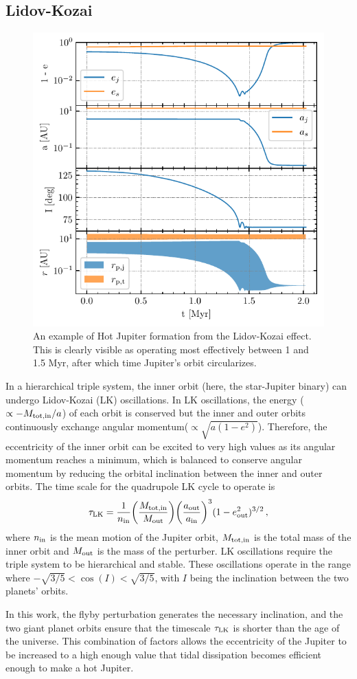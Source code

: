 \documentclass[twocolumn]{aastex63}
\begin{document}
\subsection{Lidov-Kozai}
\begin{figure}
    \includegraphics[width=.5\textwidth]{figs/example2.pdf}
    \caption{An example of Hot Jupiter formation from the Lidov-Kozai effect. This is clearly visible as operating most effectively between 1 and 1.5 Myr, after which time Jupiter's orbit circularizes.}
    \label{fig:LK}
\end{figure}
In a hierarchical triple system, the inner orbit (here, the star-Jupiter binary) can undergo Lidov-Kozai (LK) oscillations. In LK oscillations, the energy ($\propto -M_{\rm tot,in}/a$) of each orbit is conserved but the inner and outer orbits continuously exchange angular momentum($\propto \sqrt{a(1-e^2)}$). Therefore, the eccentricity of the inner orbit can be excited to very high values as its angular momentum reaches a minimum, which is balanced to conserve angular momentum by reducing the orbital inclination between the inner and outer orbits. The time scale for the quadrupole LK cycle to operate is
\begin{equation}\label{eq:time-LK}
\tau_{\rm LK}=\frac{1}{n_{\rm in}}\bigg(\frac{M_{\rm tot,in}}{M_{\rm out}} \bigg)\bigg( \frac{a_{\rm out}}{a_{\rm in}}\bigg)^3(1-e_{\rm out}^2)^{3/2}\,,
\end{equation}
where $n_{\rm in}$ is the mean motion of the Jupiter orbit, $M_{\rm tot, in}$ is the total mass of the inner orbit and $M_{\rm out}$ is the mass of the perturber. LK oscillations require the triple system to be hierarchical and stable. These oscillations operate in the range where $-\sqrt{3/5}<\cos(I)<\sqrt{3/5}$, with $I$ being the inclination between the two planets' orbits.

In this work, the flyby perturbation generates the necessary inclination, and the two giant planet orbits ensure that the timescale $\tau_{\rm LK}$ is shorter than the age of the universe. This combination of factors allows the eccentricity of the Jupiter to be increased to a high enough value that tidal dissipation becomes efficient enough to make a hot Jupiter.
\end{document}
